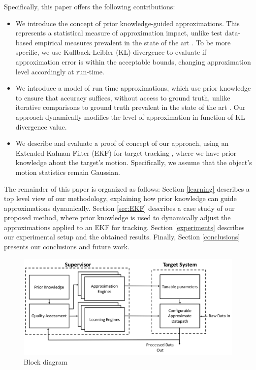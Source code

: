 \par Specifically, this paper offers the following contributions:

\begin{itemize}
\item	We introduce the concept of prior knowledge-guided approximations. This represents a statistical measure of approximation impact, unlike test data-based empirical measures prevalent in the state of the art \cite{zhang2014approxit}. To be more specific, we use Kullback-Leibler (KL) divergence to evaluate if approximation error is within the acceptable bounds, changing approximation level accordingly at run-time.
\item	We introduce a model of run time approximations, which use prior knowledge to ensure that accuracy suffices, without access to ground truth, unlike iterative comparisons to ground truth prevalent in the state of the art \cite{mittal2016survey,yazdanbakhsh2017axbench}. Our approach dynamically modifies the level of approximation in function of KL divergence value.
\item 	We describe and evaluate a proof of concept of our approach, using an Extended Kalman Filter (EKF) for target tracking \cite{kulikov2016accurate}, where we have prior knowledge about the target's motion. Specifically, we assume that the object's motion statistics remain Gaussian.
\end{itemize}

\par The remainder of this paper is organized as follows: Section \ref{learning} describes a top level view of our methodology, explaining how prior knowledge can guide approximations dynamically. Section \ref{sec:EKF} describes a case study of our proposed method, where prior knowledge is used to dynamically adjust the approximations applied to an EKF for tracking. Section \ref{experiments} describes our experimental setup and the obtained results. Finally, Section \ref{conclusions} presents our conclusions and future work. 


\begin{figure}[tb]
  \centering
  \includegraphics[width=\columnwidth]{img/block_diagram.png}
  \caption{Block diagram}
  \label{fig:block_diagram}
\end{figure}
